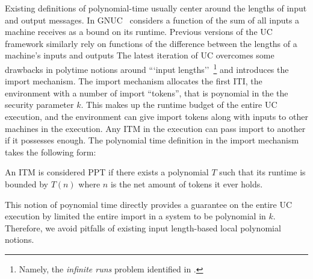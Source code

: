 \begin{theorem}[Composition]
Existing definitions of polynomial-time usually center around the lengths of input and output messages. In GNUC~\cite{gnuc} considers a function of the sum of all inputs a machine receives as a bound on its runtime. Previous versions of the UC framework similarly rely on functions of the difference between the lengths of a machine's inputs and outputs
The latest iteration of UC overcomes some drawbacks in polytime notions around ```input lengths''~\footnote{Namely, the \emph{infinite runs} problem identified in \cite{uc}.} and introduces the import mechanism.
The import mechanism allocates the first ITI, the environment with a number of import ``tokens'', that is poynomial in the the security parameter $k$. 
This makes up the runtime budget of the entire UC execution, and the environment can give import tokens along with inputs to other machines in the execution. Any ITM in the execution can pass import to another if it possesses enough.
The polynomial time definition in the import mechanism takes the following form:

\begin{center} {\small An ITM is considered PPT if there exists a polynomial $T$ such that its runtime is bounded by $T(n)$ where $n$ is the net amount of tokens it ever holds.} \end{center}

This notion of poynomial time directly provides a guarantee on the entire UC execution by limited the entire import in a system to be polynomial in $k$. Therefore, we avoid pitfalls of existing input length-based local polynomial notions.


\end{theorem}
